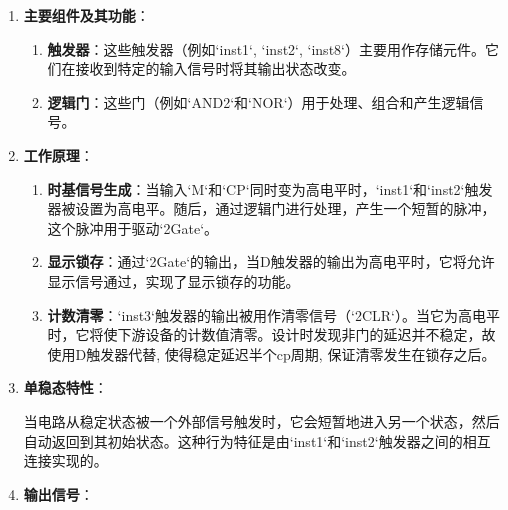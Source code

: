 \documentclass[UTF8,titlepage,a4paper]{ctexart}
\numberwithin{figure}{section}
\begin{document}
\begin{enumerate}
    \item \textbf{主要组件及其功能}：
    \begin{enumerate}
        \item \textbf{触发器}：这些触发器（例如`inst1`, `inst2`, `inst8`）主要用作存储元件。它们在接收到特定的输入信号时将其输出状态改变。
        
        \item \textbf{逻辑门}：这些门（例如`AND2`和`NOR`）用于处理、组合和产生逻辑信号。
    \end{enumerate}
    
    \item \textbf{工作原理}：
    \begin{enumerate}
        \item \textbf{时基信号生成}：当输入`M`和`CP`同时变为高电平时，`inst1`和`inst2`触发器被设置为高电平。随后，通过逻辑门进行处理，产生一个短暂的脉冲，这个脉冲用于驱动`2Gate`。
        
        \item \textbf{显示锁存}：通过`2Gate`的输出，当D触发器的输出为高电平时，它将允许显示信号通过，实现了显示锁存的功能。
        
        \item \textbf{计数清零}：`inst3`触发器的输出被用作清零信号（`2CLR`）。当它为高电平时，它将使下游设备的计数值清零。设计时发现非门的延迟并不稳定，故使用D触发器代替, 使得稳定延迟半个cp周期, 保证清零发生在锁存之后。
    \end{enumerate}
    
    \item \textbf{单稳态特性}：
    
    当电路从稳定状态被一个外部信号触发时，它会短暂地进入另一个状态，然后自动返回到其初始状态。这种行为特征是由`inst1`和`inst2`触发器之间的相互连接实现的。

    \item \textbf{输出信号}：


\end{enumerate}
\end{document}
